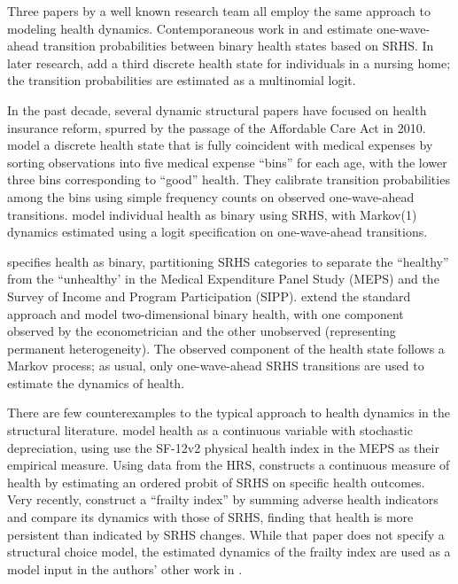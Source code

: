 \documentclass[12pt,pdftex,letterpaper]{article}
\begin{document}
Three papers by a well known research team all employ the same approach to modeling health dynamics. Contemporaneous work in \cite{French11} and \cite{DeNardi10} estimate one-wave-ahead transition probabilities between binary health states based on SRHS.  In later research, \cite{DeNardi16} add a third discrete health state for individuals in a nursing home; the transition probabilities are estimated as a multinomial logit.

In the past decade, several dynamic structural papers have focused on health insurance reform, spurred by the passage of the Affordable Care Act in 2010. \cite{Pashchenko13} model a discrete health state that is fully coincident with medical expenses by sorting observations into five medical expense ``bins'' for each age, with the lower three bins corresponding to ``good'' health. They calibrate transition probabilities among the bins using simple frequency counts on observed one-wave-ahead transitions. \cite{Ferreira17} model individual health as binary using SRHS, with Markov(1) dynamics estimated using a logit specification on one-wave-ahead transitions. 

\cite{Aizawa19} specifies health as binary, partitioning SRHS categories to separate the ``healthy'' from the ``unhealthy' in the Medical Expenditure Panel Study (MEPS) and the Survey of Income and Program Participation (SIPP). \cite{AizawaFang20} extend the standard approach and model two-dimensional binary health, with one component observed by the econometrician and the other unobserved (representing permanent heterogeneity). The observed component of the health state follows a Markov process; as usual, only one-wave-ahead SRHS transitions are used to estimate the dynamics of health.

There are few counterexamples to the typical approach to health dynamics in the structural literature. \cite{JungTran16} model health as a continuous variable with stochastic depreciation, using use the SF-12v2 physical health index in the MEPS as their empirical measure. Using data from the HRS, \cite{White18} constructs a continuous measure of health by estimating an ordered probit of SRHS on specific health outcomes. Very recently, \cite{HosseiniZhao21a} construct a ``frailty index'' by summing adverse health indicators and compare its dynamics with those of SRHS, finding that health is more persistent than indicated by SRHS changes. While that paper does not specify a structural choice model, the estimated dynamics of the frailty index are used as a model input in the authors' other work in \cite{HosseiniZhao21b}.
\end{document}
